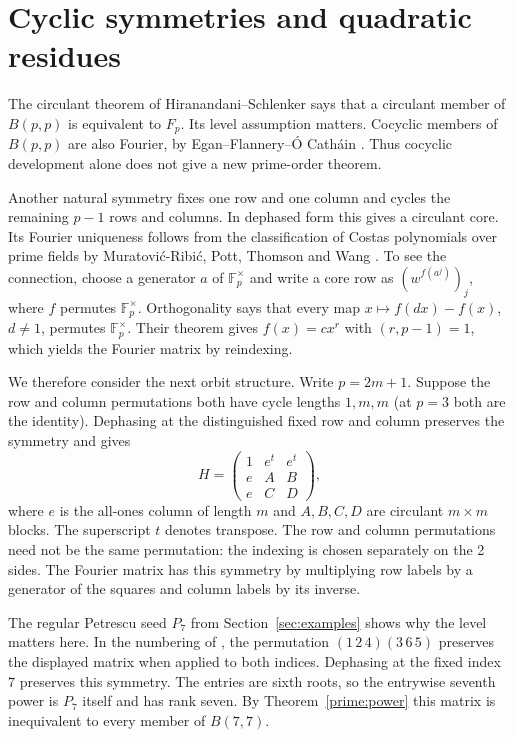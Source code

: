 \documentclass[11pt,a4paper]{article}
\numberwithin{equation}{section}
\begin{document}
\section{Cyclic symmetries and quadratic residues}\label{sec:orbits}

The circulant theorem of Hiranandani--Schlenker \cite{hs} says that a circulant member of $B(p,p)$ is equivalent to $F_p$. Its level assumption matters. Cocyclic members of $B(p,p)$ are also Fourier, by Egan--Flannery--\'O Cath\'ain \cite[Corollary~5.9]{efoc}. Thus cocyclic development alone does not give a new prime-order theorem.

Another natural symmetry fixes one row and one column and cycles the remaining $p-1$ rows and columns. In dephased form this gives a circulant core. Its Fourier uniqueness follows from the classification of Costas polynomials over prime fields by Muratovi\'c-Ribi\'c, Pott, Thomson and Wang \cite{costas}. To see the connection, choose a generator $a$ of $\mathbb F_p^\times$ and write a core row as $(w^{f(a^j)})_j$, where $f$ permutes $\mathbb F_p^\times$. Orthogonality says that every map $x\mapsto f(dx)-f(x)$, $d\ne1$, permutes $\mathbb F_p^\times$. Their theorem gives $f(x)=cx^r$ with $(r,p-1)=1$, which yields the Fourier matrix by reindexing.

We therefore consider the next orbit structure. Write $p=2m+1$. Suppose the row and column permutations both have cycle lengths $1,m,m$ (at $p=3$ both are the identity). Dephasing at the distinguished fixed row and column preserves the symmetry and gives
\begin{equation}\label{prime:blocks}
H=\begin{pmatrix}1&e^t&e^t\\ e&A&B\\ e&C&D\end{pmatrix},
\end{equation}
where $e$ is the all-ones column of length $m$ and $A,B,C,D$ are circulant $m\times m$ blocks. The superscript $t$ denotes transpose. The row and column permutations need not be the same permutation: the indexing is chosen separately on the 2 sides. The Fourier matrix has this symmetry by multiplying row labels by a generator of the squares and column labels by its inverse.

The regular Petrescu seed $P_7$ from Section~\ref{sec:examples} shows why the level matters here. In the numbering of \cite[Example~5.4]{szexotic}, the permutation $(1\,2\,4)(3\,6\,5)$ preserves the displayed matrix when applied to both indices. Dephasing at the fixed index $7$ preserves this symmetry. The entries are sixth roots, so the entrywise seventh power is $P_7$ itself and has rank seven. By Theorem~\ref{prime:power} this matrix is inequivalent to every member of $B(7,7)$.
\end{document}
